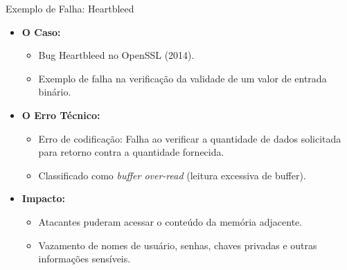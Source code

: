 \begin{frame}{Exemplo de Falha: Heartbleed}
    \begin{itemize}
        \item \textbf{O Caso:}
              \begin{itemize}
                  \item Bug Heartbleed no OpenSSL (2014).
                  \item Exemplo de falha na verificação da validade de um valor de entrada binário.
              \end{itemize}

        \item \textbf{O Erro Técnico:}
              \begin{itemize}
                  \item Erro de codificação: Falha ao verificar a quantidade de dados solicitada para retorno contra a quantidade fornecida.
                  \item Classificado como \textit{buffer over-read} (leitura excessiva de buffer).
              \end{itemize}

        \item \textbf{Impacto:}
              \begin{itemize}
                  \item Atacantes puderam acessar o conteúdo da memória adjacente.
                  \item Vazamento de nomes de usuário, senhas, chaves privadas e outras informações sensíveis.
              \end{itemize}
    \end{itemize}
\end{frame}
